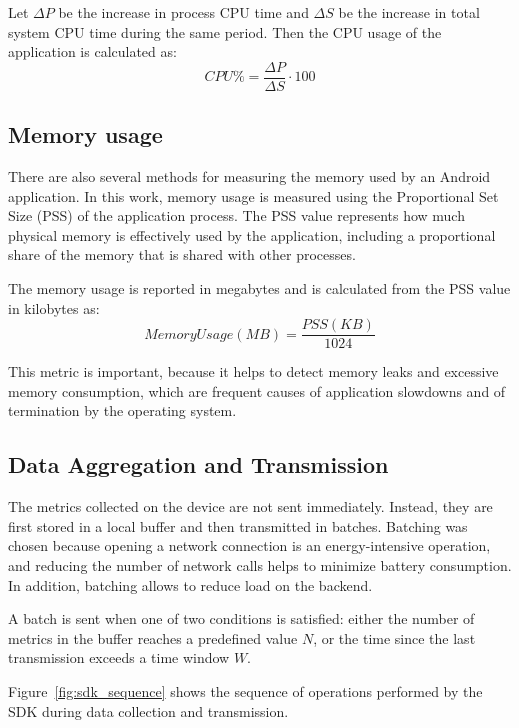 Let $\Delta P$ be the increase in process CPU time and $\Delta S$ be the increase in total system CPU time during the same period. Then the CPU usage of the application is calculated as:
\begin{equation}
    CPU\% = \frac{\Delta P}{\Delta S} \cdot 100
\end{equation}

\subsection{Memory usage}

There are also several methods for measuring the memory used by an Android application. In this work, memory usage is measured using the Proportional Set Size (PSS) of the application process. The PSS value represents how much physical memory is effectively used by the application, including a proportional share of the memory that is shared with other processes.

The memory usage is reported in megabytes and is calculated from the PSS value in kilobytes as:
\begin{equation}
    MemoryUsage(MB) = \frac{PSS(KB)}{1024}
\end{equation}

This metric is important, because it helps to detect memory leaks and excessive memory consumption, which are frequent causes of application slowdowns and of termination by the operating system.

\subsection{Data Aggregation and Transmission}

The metrics collected on the device are not sent immediately. Instead, they are first stored in a local buffer and then transmitted in batches. Batching was chosen because opening a network connection is an energy-intensive operation, and reducing the number of network calls helps to minimize battery consumption. In addition, batching allows to reduce load on the backend.

A batch is sent when one of two conditions is satisfied: either the number of metrics in the buffer reaches a predefined value $N$, or the time since the last transmission exceeds a time window $W$.

Figure~\ref{fig:sdk_sequence} shows the sequence of operations performed by the SDK during data collection and transmission.

